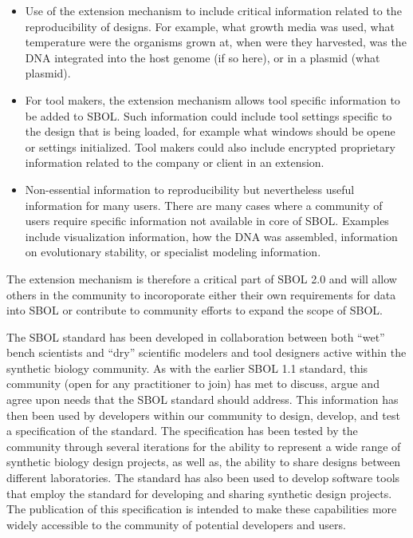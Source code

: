 \begin{itemize}
\item Use of the extension mechanism to include critical information related to the reproducibility of designs. For example, what growth media was used, what temperature were the organisms grown at, when were they harvested, was the DNA integrated into the host genome (if so here), or in a plasmid (what plasmid).
\item For tool makers, the extension mechanism allows tool specific information to be added to SBOL. Such information could include tool settings specific to the design that is being loaded, for example what windows should be opene or settings initialized. Tool makers could also include encrypted proprietary information related to the company or client in an extension. 
\item Non-essential information to reproducibility but nevertheless useful information for many users. There are many cases where a community of users require specific information not available in core of SBOL. Examples include visualization information, how the DNA was assembled, information on evolutionary stability, or specialist modeling information.
\end{itemize}

The extension mechanism is therefore a critical part of SBOL 2.0 and will allow others in the community to incoroporate either their own requirements for data into SBOL or contribute to community efforts to expand the scope of SBOL.


The SBOL standard has been developed in collaboration between both ``wet'' bench scientists and ``dry'' scientific modelers and tool designers active within the synthetic biology community. 
As with the earlier SBOL 1.1 standard, this community (open for any practitioner to join) has met to discuss, argue and agree upon needs that the SBOL standard should address. 
This information has then been used by developers within our community to design, develop, and test a specification of the standard. The specification has been tested by the community through several iterations for the ability to represent a wide range of synthetic biology design projects, as well as, the ability to share designs between different laboratories. 
The standard has also been used to develop software tools that employ the standard for developing and sharing synthetic design projects. 
The publication of this specification is intended to make these capabilities more widely accessible to the community of potential developers and users.